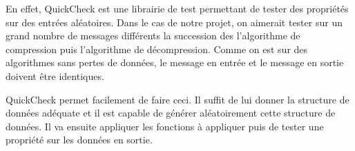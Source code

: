         \smallskip

        En effet, QuickCheck est une librairie de test permettant de tester des propriétés sur des entrées aléatoires. Dans le cas de notre projet, on aimerait tester sur un grand nombre de messages différents la succession des l'algorithme de compression puis l'algorithme de décompression. Comme on est sur des algorithmes sans pertes de données, le message en entrée et le message en sortie doivent être identiques.

        \smallskip

        QuickCheck permet facilement de faire ceci. Il suffit de lui donner la structure de données adéquate et il est capable de générer aléatoirement cette structure de données. Il va ensuite appliquer les fonctions à appliquer puis de tester une propriété sur les données en sortie.